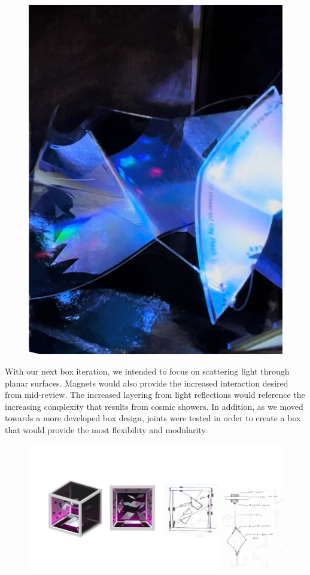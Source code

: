 \documentclass{article}
\begin{document}
\begin{figure} [h]
\begin{minipage}[b]{0.4\textwidth}
    \includegraphics[width=\textwidth]{images/unnamed5.jpg}
  \end{minipage}
\end{figure}

With our next box iteration, we intended to focus on scattering light through planar surfaces. Magnets would also provide the increased interaction desired from mid-review. The increased layering from light reflections would reference the increasing complexity that results from cosmic showers. In addition, as we moved towards a more developed box design, joints were tested in order to create a box that would provide the most flexibility and modularity. 

\begin{figure} [h]
    \centering
    \includegraphics[width=1\linewidth]{images/unnamed6.png}
\end{figure}
\end{document}
